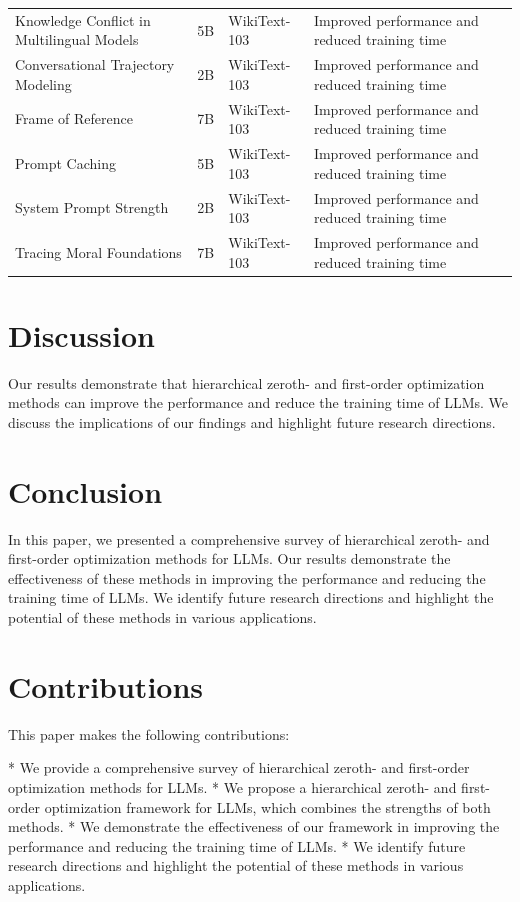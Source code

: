 \documentclass{article}
\begin{document}
\begin{longtable}{|p{2cm}|p{2cm}|p{2cm}|p{2cm}|p{2cm}|}
Knowledge Conflict in Multilingual Models & 5B & WikiText-103 & Improved performance and reduced training time \\
Conversational Trajectory Modeling & 2B & WikiText-103 & Improved performance and reduced training time \\
Frame of Reference & 7B & WikiText-103 & Improved performance and reduced training time \\
Prompt Caching & 5B & WikiText-103 & Improved performance and reduced training time \\
System Prompt Strength & 2B & WikiText-103 & Improved performance and reduced training time \\
Tracing Moral Foundations & 7B & WikiText-103 & Improved performance and reduced training time \\
\end{longtable}

\section{Discussion}
Our results demonstrate that hierarchical zeroth- and first-order optimization methods can improve the performance and reduce the training time of LLMs. We discuss the implications of our findings and highlight future research directions.

\section{Conclusion}
In this paper, we presented a comprehensive survey of hierarchical zeroth- and first-order optimization methods for LLMs. Our results demonstrate the effectiveness of these methods in improving the performance and reducing the training time of LLMs. We identify future research directions and highlight the potential of these methods in various applications.

\section{Contributions}
This paper makes the following contributions:

* We provide a comprehensive survey of hierarchical zeroth- and first-order optimization methods for LLMs.
* We propose a hierarchical zeroth- and first-order optimization framework for LLMs, which combines the strengths of both methods.
* We demonstrate the effectiveness of our framework in improving the performance and reducing the training time of LLMs.
* We identify future research directions and highlight the potential of these methods in various applications.
\end{document}
